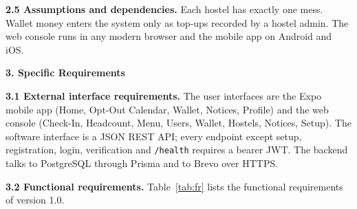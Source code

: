 \documentclass[11pt,a4paper]{article}
\begin{document}
\textbf{2.5 Assumptions and dependencies.} Each hostel has exactly one mess.
Wallet money enters the system only as top-ups recorded by a hostel admin.
The web console runs in any modern browser and the mobile app on Android and
iOS.

\textbf{3. Specific Requirements}

\textbf{3.1 External interface requirements.} The user interfaces are the Expo
mobile app (Home, Opt-Out Calendar, Wallet, Notices, Profile) and the web
console (Check-In, Headcount, Menu, Users, Wallet, Hostels, Notices, Setup). The
software interface is a JSON REST API; every endpoint except setup,
registration, login, verification and \texttt{/health} requires a bearer JWT.
The backend talks to PostgreSQL through Prisma and to Brevo over HTTPS.

\textbf{3.2 Functional requirements.} Table~\ref{tab:fr} lists the functional
requirements of version 1.0.
\end{document}
